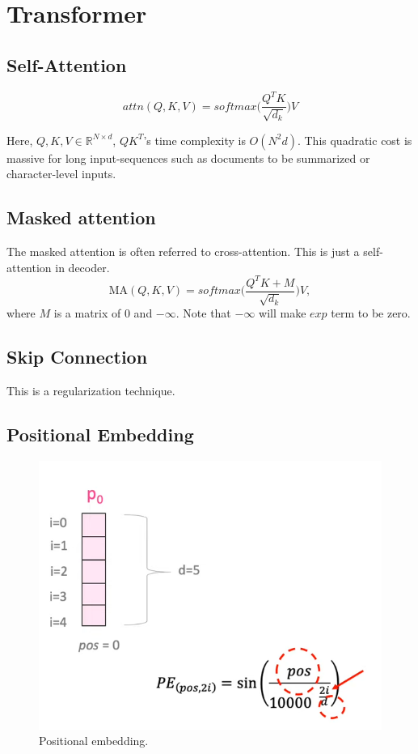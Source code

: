 \section{Transformer}
\label{sec:nlp_transformer}


\subsection{Self-Attention}
$$attn(Q,K,V) = softmax\bigg(\frac{Q^TK}{\sqrt{d_k}}\bigg)V$$

Here, $Q, K, V\in \mathbb{R}^{N\times d}$, $QK^T$'s time complexity is $O(N^2d)$. This quadratic cost is massive for long input-sequences such as documents to be summarized or character-level inputs.


\subsection{Masked attention}
The masked attention is often referred to cross-attention. This is just a self-attention in decoder.
$$\textrm{MA}(Q,K,V) = softmax\bigg(\frac{Q^TK+M}{\sqrt{d_k}}\bigg)V,$$
where $M$ is a matrix of 0 and $-\infty$. Note that $-\infty$ will make $exp$ term to be zero.

\subsection{Skip Connection}
This is a regularization technique.

\subsection{Positional Embedding}

\begin{figure}[t]
	\centering
	\includegraphics[scale=0.6]{./images/transformer/positional_1.png}
	\caption{Positional embedding.}
\end{figure}


